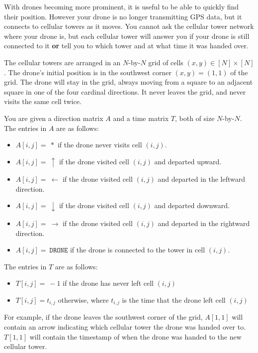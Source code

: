 \documentclass[10pt]{article}
\begin{document}
With drones becoming more prominent, it is useful to be able to quickly find their position. However your drone is no longer transmitting GPS data, but it connects to cellular towers as it moves. You cannot ask the cellular tower network where your drone is, but each cellular tower will answer you if your drone is still connected to it \textbf{or} tell you to which tower and at what time it was handed over. 

The cellular towers are arranged in an $N$-by-$N$ grid of cells $(x, y) \in [N]\times [N]$. The drone's initial position is in the southwest corner $(x, y) = (1, 1)$ of the grid. The drone will stay in the grid, always moving from a square to an adjacent square in one of the four cardinal directions. It never leaves the grid, and never visits the same cell twice.

You are given a direction matrix $A$ and a time matrix $T$, both of size $N$-by-$N$. The entries in $A$ are as follows:
\begin{itemize}
\item $A[i, j] = \ *$ if the drone never visits cell $(i, j)$.
\item $A[i, j] = \ \uparrow$ if the drone visited cell $(i, j)$ and departed upward. 
\item $A[i, j] = \  \leftarrow$ if the drone visited cell $(i, j)$ and departed in the leftward direction.  
\item $A[i, j] = \ \downarrow$ if the drone visited cell $(i, j)$ and departed downward. 
\item $A[i, j] = \ \rightarrow$ if the drone visited cell $(i, j)$ and departed in the rightward direction.  
\item $A[i, j] = \ \texttt{DRONE} $ if the drone is connected to the tower in cell $(i, j)$.
\end{itemize}

The entries in $T$ are as follows:

\begin{itemize}
    \item $T[i,j] = \ -1$ if the drone has never left cell $(i,j)$
    \item $T[i,j] = t_{i,j}$ otherwise, where $t_{i,j}$ is the time that the drone left cell $(i,j)$
\end{itemize}

For example, if the drone leaves the southwest corner of the grid, $A[1, 1]$ will contain an arrow indicating which cellular tower the drone was handed over to. $T[1,1]$ will contain the timestamp of when the drone was handed to the new cellular tower. 
\end{document}
